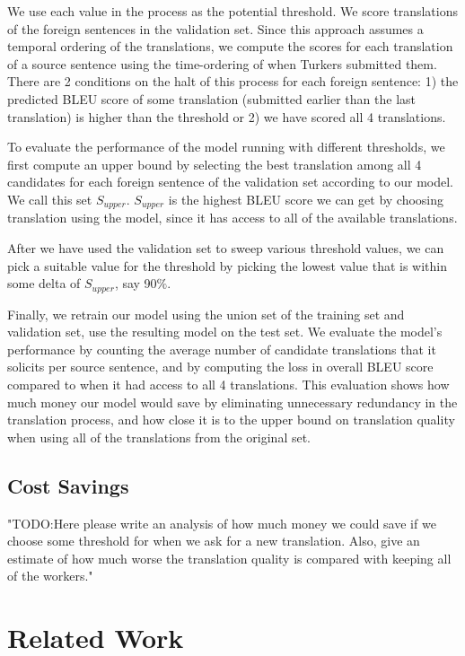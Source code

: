\documentclass[11pt]{article}
\begin{document}
 We use each value  in the process  as the potential threshold.  We score translations of the foreign sentences in the validation set.  Since this approach assumes a temporal ordering of the translations, we compute the scores for each translation of a source sentence using the time-ordering of when Turkers submitted them. There are 2 conditions on the halt of this process for each foreign sentence: 1) the predicted BLEU score of some translation (submitted earlier than the last translation) is higher than the threshold or 2) we have scored all 4 translations.  

To evaluate the performance of the model running with different thresholds, we first compute an upper bound by selecting the best translation among all 4 candidates for each foreign sentence of the validation set according to our  model. We call this set $S_{upper}$.  $S_{upper}$ is the highest BLEU score we can get by choosing translation using the model, since it has access to all of the available translations.  

After we have used the validation set to sweep various threshold values,  we can pick a suitable value for the threshold by picking the lowest value that is within some delta of $S_{upper}$, say  90$\%$. 

Finally, we retrain our model using the union set of the training set and validation set, use the resulting model on the test set.  We evaluate the model's performance by counting the average number of candidate translations that it solicits per source sentence, and by computing the loss in overall BLEU score compared to when it had access to all 4 translations.  This evaluation shows how much money our model would save by eliminating unnecessary redundancy in the translation process, and how close it is to the upper bound on translation quality when using all of the translations from the original set.

\subsection{Cost Savings}

"TODO:Here please write an analysis of how much money we could save if we choose some threshold for when we ask for a new translation.  Also, give an estimate of how much worse the translation quality is compared with keeping all of the workers."

\section{Related Work}
\end{document}
